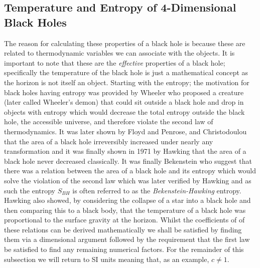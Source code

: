 \documentclass[12pt]{article}
\numberwithin{equation}{section}
\numberwithin{figure}{section}
\begin{document}
\subsection{Temperature and Entropy of 4-Dimensional Black Holes} %
\label{sub:temperature_and_entropy}
The reason for calculating these properties of a black hole is because these are related to thermodynamic variables we can associate with the objects. It is important to note that these are the \emph{effective} properties of a black hole; specifically the temperature of the black hole is just a mathematical concept as the horizon is not itself an object. Starting with the entropy; the motivation for black holes having entropy was provided by Wheeler who proposed a creature (later called Wheeler's demon) that could sit outside a black hole and drop in objects with entropy which would decrease the total entropy outside the black hole, the accessible universe, and therefore violate the second law of thermodynamics. It was later shown by Floyd and Penrose, and Christodoulou that the area of a black hole irreversibly increased under nearly any transformation and it was finally shown in 1971 by Hawking that the area of a black hole never decreased classically. It was finally Bekenstein who suggest that there was a relation between the area of a black hole and its entropy which would solve the violation of the second law which was later verified by Hawking and as such the entropy $S_{BH}$ is often referred to as the \emph{Bekenstein-Hawking} entropy. Hawking also showed, by considering the collapse of a star into a black hole and then comparing this to a black body, that the temperature of a black hole was proportional to the surface gravity at the horizon. Whilst the coefficients of of these relations can be derived mathematically we shall be satisfied by finding them via a dimensional argument followed by the requirement that the first law be satisfied to find any remaining numerical factors. For the remainder of this subsection we will return to SI units meaning that, as an example, $c\ne 1$.
\end{document}
